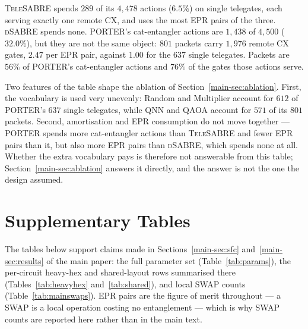 \documentclass[journal]{IEEEtran}
\newcommand{\PORTER}{\textsc{PORTER}}
\newcommand{\TeleSABRE}{\textsc{TeleSABRE}}
\newcommand{\dSABRE}{\textsc{dSABRE}}
\begin{document}
\TeleSABRE{} spends $289$ of its $4{,}478$ actions ($6.5\%$) on single
telegates, each serving exactly one remote CX, and uses the most EPR
pairs of the three. \dSABRE{} spends none. \PORTER{}'s cat-entangler
actions are $1{,}438$ of $4{,}500$ ($32.0\%$), but they are not the same
object: $801$ packets carry $1{,}976$ remote CX gates, $2.47$ per EPR
pair, against $1.00$ for the $637$ single telegates. Packets are $56\%$
of \PORTER{}'s cat-entangler actions and $76\%$ of the gates those
actions serve.

Two features of the table shape the ablation of
Section~\ref{main-sec:ablation}. First, the vocabulary is used very unevenly:
Random and Multiplier account for $612$ of \PORTER{}'s $637$ single
telegates, while QNN and QAOA account for $571$ of its $801$ packets.
Second, amortisation and EPR consumption do not move together ---
\PORTER{} spends more cat-entangler actions than \TeleSABRE{} and fewer
EPR pairs than it, but also more EPR pairs than \dSABRE{}, which spends
none at all. Whether the extra vocabulary pays is therefore not
answerable from this table; Section~\ref{main-sec:ablation} answers it
directly, and the answer is not the one the design assumed.


\section{Supplementary Tables}
\label{app:tables}

The tables below support claims made in Sections~\ref{main-sec:sfc}
and~\ref{main-sec:results} of the main paper: the full parameter set
(Table~\ref{tab:params}), the per-circuit heavy-hex and shared-layout
rows summarised there (Tables~\ref{tab:heavyhex} and~\ref{tab:shared}),
and local SWAP counts
(Table~\ref{tab:mainswaps}). EPR pairs are the figure of merit throughout
--- a SWAP is a local operation costing no entanglement --- which is why
SWAP counts are reported here rather than in the main text.
\end{document}

